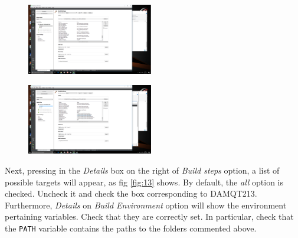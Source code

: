 \documentclass[a4paper,10pt]{article}
\begin{document}
\begin{minipage}{0.5\linewidth}
\begin{figure}[H]
\begin{center}
\includegraphics[width=5.5cm]{fig11.png}
\vspace*{-1mm}
\caption{\small  \label{fig:11}}
\end{center}
\end{figure}
\end{minipage}
\begin{minipage}{0.5\linewidth}
\begin{figure}[H]
\begin{center}
\includegraphics[width=5.5cm]{fig12.png}
\vspace*{-1mm}
\caption{\small  \label{fig:12}}
\end{center}
\end{figure}
\end{minipage}

Next, pressing in the {\it Details} box on the right of {\it Build steps} option, 
a list of possible targets will appear, as fig \ref{fig:13} shows. By default, the {\it all} option is checked.
Uncheck it and check the box corresponding to DAMQT213. Furthermore, {\it Details}
on {\it Build Environment} option will show the environment pertaining variables.
Check that they are correctly set. In particular, check that the \texttt{PATH} variable contains
the paths to the folders commented above.
\end{document}
